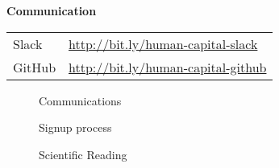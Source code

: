\begin{frame}
\textbf{Communication}\\\vspace{0.5cm}
\begin{tabular}{ll}
Slack     & \url{http://bit.ly/human-capital-slack} \\
GitHub    & \url{http://bit.ly/human-capital-github} \\
\end{tabular}
\end{frame}
\begin{frame}
\begin{figure}[htp]\centering
\caption{Communications}
\end{figure}
\end{frame}
\begin{frame}
\begin{figure}[htp]\centering
\caption{Signup process}
\end{figure}
\end{frame}
\begin{frame}
\begin{figure}[htp]\centering
\caption{Scientific Reading}
\end{figure}
\nocite{Adler.1972}\nocite{Keshav2016}
\end{frame}
